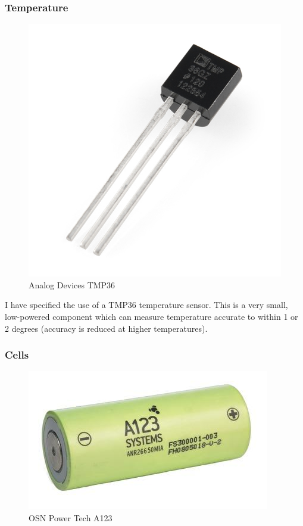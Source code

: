 \documentclass[a4paper, twoside]{article}
\begin{document}
\clearpage
\subsubsection{Temperature}
\begin{figure}
	\vspace{-40pt}
	\begin{center}
		\includegraphics[scale=0.4]{images/tmp36.jpg}
	\end{center}
	\caption{Analog Devices TMP36}
\end{figure}

I have specified the use of a TMP36 temperature sensor. This is a very small,
low-powered component which can measure temperature accurate to within 1 or 2
degrees (accuracy is reduced at higher temperatures).

\subsubsection{Cells}
\begin{figure}
	\vspace{-20pt}
	\begin{center}
		\includegraphics[scale=0.15]{images/a123.jpg}
	\end{center}
	\caption{OSN Power Tech A123}
	\vspace{-20pt}
\end{figure}
\end{document}
